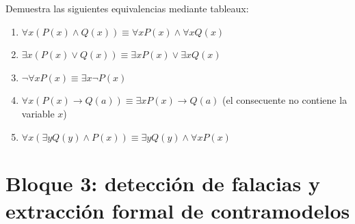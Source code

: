 \begin{pregunta}\label{e6-5}
Demuestra las siguientes equivalencias mediante tableaux:
\begin{enumerate}
    \item $\forall x (P(x) \land Q(x)) \equiv \forall x P(x) \land \forall x Q(x)$
    \item $\exists x (P(x) \lor Q(x)) \equiv \exists x P(x) \lor \exists x Q(x)$
    \item $\neg \forall x P(x) \equiv \exists x \neg P(x)$
    \item $\forall x (P(x) \to Q(a)) \equiv \exists x P(x) \to Q(a)$ \quad (el consecuente no contiene la variable $x$)
    \item $\forall x (\exists y Q(y) \land P(x)) \equiv \exists y Q(y) \land \forall x P(x)$ 
\end{enumerate}
\end{pregunta}

\section*{Bloque 3: detección de falacias y extracción formal de contramodelos}

